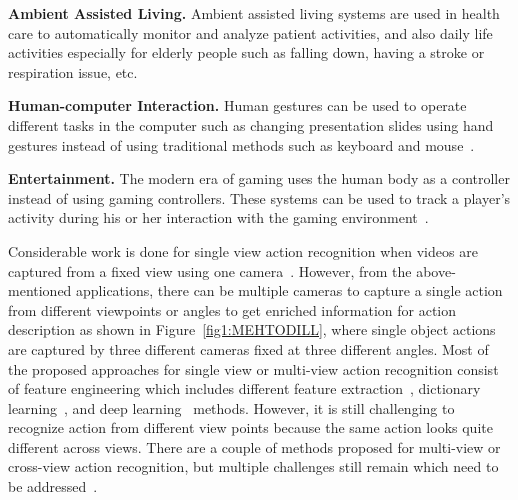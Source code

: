 \noindent
\textbf{Ambient Assisted Living.} Ambient assisted living systems are used in health care \cite{MUBASHIR2013144} to automatically monitor and analyze patient activities, and also daily life activities especially for elderly people such as falling down, having a stroke or respiration issue, etc.

\noindent
\textbf{Human-computer Interaction.} Human gestures can be used to operate different tasks in the computer such as changing presentation slides using hand gestures instead of using traditional methods such as keyboard and mouse~\cite{799904}.

\noindent
\textbf{Entertainment.} The modern era of gaming uses the human body as a controller instead of using gaming controllers. These systems can be used to track a player's activity during his or her interaction with the gaming environment~\cite{VALLIM20136258}.

Considerable work is done for single view action recognition when videos are captured from a fixed view using one camera~\cite{sharma2013expanded,liang2013learning,wu2014multi,benmokhtar2014robust,papadopoulos2014real}. However, from the above-mentioned applications, there can be multiple cameras to capture a single action from different viewpoints or angles to get enriched information for action description as shown in Figure~\ref{fig1:MEHTODILL}, where single object actions are captured by three different cameras fixed at three different angles. Most of the proposed approaches  for single view or multi-view action recognition consist of feature engineering which includes different feature extraction~\cite{Efros:2003:RAD:946247.946720,4270156,5459184,wang2013action,1238378}, dictionary learning~\cite{8082519,4483511,zheng2016cross}, and deep learning~\cite{deng2014deep} methods.
However, it is still challenging to recognize action from different view points because the same action looks quite different across views. There are a couple of methods proposed for multi-view or cross-view action recognition, but multiple challenges still remain which need to be addressed~\cite{ji2010advances,holte2011human}.

